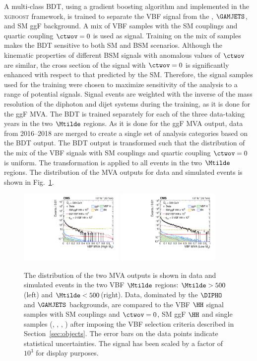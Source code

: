 \documentclass[11pt,a4paper,cmspaper,final,collab]{cms-tdr}
\begin{document}
A multi-class BDT, using a gradient boosting algorithm and implemented in the \textsc{xgboost} \cite{xgboost} framework, is trained to separate the VBF \HH signal from the \DIPHO, $\GAMJETS$, and SM ggF \HH background. A mix of VBF \HH samples with the SM couplings and quartic coupling $\ctwov=0$ is used as signal.
Training on the mix of samples makes the BDT sensitive to both SM and BSM scenarios.
Although the kinematic properties of different BSM signals with anomalous values of $\ctwov$ are similar, the cross section of the signal with $\ctwov=0$ is significantly enhanced with respect to that predicted by the SM. Therefore, the signal samples used for the training were chosen to maximize sensitivity of the analysis to a range of potential signals. Signal events are weighted with the inverse of the mass resolution of the diphoton and dijet systems during the training, as it is done for the ggF MVA.
The BDT is trained separately for each of the three data-taking years in the two $\Mtilde$ regions. As it is done for the ggF MVA output, data from 2016--2018 are merged to create a single set of analysis categories based on the BDT output. The BDT output is transformed such that the distribution of the mix of the VBF \HH signals with SM couplings and quartic coupling $\ctwov=0$ is uniform. The transformation is applied to all events in the two $\Mtilde$ regions. The distribution of the MVA outputs for data and simulated events is shown in Fig.~\ref{fig:cumulativeVBF}.
\begin{figure}[thb]
  \centering
  \includegraphics[width=0.45\textwidth]{Figure_006-a.pdf}\hfil 
  \includegraphics[width=0.45\textwidth]{Figure_006-b.pdf}\hfil 
  \caption{The distribution of the two MVA outputs is shown in data and simulated events in the two VBF $\Mtilde$ regions: $\Mtilde>500$\GeV (left) and $\Mtilde<500$\GeV (right). Data, dominated by the $\DIPHO$ and $\GAMJETS$ backgrounds, are compared to the VBF $\HH$ signal samples with SM couplings and $\ctwov=0$, SM ggF $\HH$ and single \PH samples (\ttH, \ggH, \VBFH, \VH) after imposing the VBF selection criteria described in Section~\ref{sec:objects}. The error bars on the data points indicate statistical uncertainties. The \HH signal has been scaled by a factor of $10^{3}$ for display purposes. }
  \label{fig:cumulativeVBF}
\end{figure}
\end{document}
